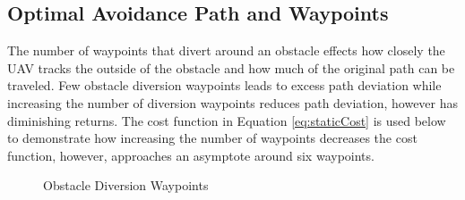 \documentclass[numbered,pdftex]{ohio-etd}
\begin{document}
\subsection{Optimal Avoidance Path and Waypoints}

 The number of waypoints that divert around an obstacle effects how closely the UAV tracks the outside of the obstacle and how much of the original path can be traveled. Few obstacle diversion waypoints leads to excess path deviation while increasing the number of diversion waypoints reduces path deviation, however has diminishing returns. The cost function in Equation \ref{eq:staticCost} is used below to demonstrate how increasing the number of waypoints decreases the cost function, however, approaches an asymptote around six waypoints.


\begin{figure}[H]
	\begin{subfigmatrix}{2}%
		\centering	
		\hspace*{0mm}
	\end{subfigmatrix}
	\caption{Obstacle Diversion Waypoints}
	\label{fig:numWaypointsPath}
\end{figure}
\end{document}
